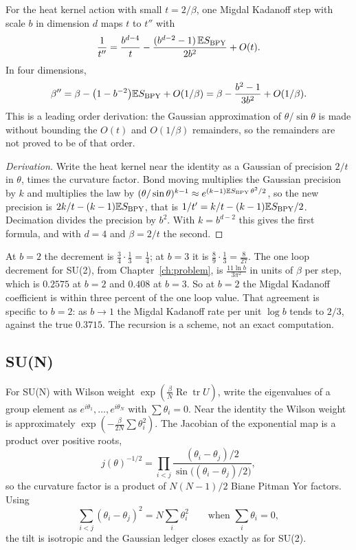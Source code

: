 \begin{remark}\label{prop:decrementB}
For the heat kernel action with small $t=2/\beta$, one Migdal Kadanoff step with scale $b$ in dimension $d$ maps $t$ to $t''$ with
\[
\frac1{t''}=\frac{b^{d-4}}{t}-\frac{(b^{d-2}-1)\,\mathbb{E} S_{\mathrm{BPY}}}{2b^2}+O(t).
\]
In four dimensions,
\[
\beta''=\beta-\big(1-b^{-2}\big)\mathbb{E} S_{\mathrm{BPY}}+O(1/\beta)=\beta-\frac{b^2-1}{3b^2}+O(1/\beta).
\]
This is a leading order derivation: the Gaussian approximation of $\theta/\sin\theta$ is made without bounding the $O(t)$ and $O(1/\beta)$ remainders, so the remainders are not proved to be of that order.
\end{remark}

\begin{proof}[Derivation]
Write the heat kernel near the identity as a Gaussian of precision $2/t$ in $\theta$, times the curvature factor. Bond moving multiplies the Gaussian precision by $k$ and multiplies the law by $(\theta/\sin\theta)^{k-1}\approx e^{(k-1)\mathbb{E} S_{\mathrm{BPY}}\,\theta^2/2}$, so the new precision is $2k/t-(k-1)\mathbb{E} S_{\mathrm{BPY}}$, that is $1/t'=k/t-(k-1)\mathbb{E} S_{\mathrm{BPY}}/2$. Decimation divides the precision by $b^2$. With $k=b^{d-2}$ this gives the first formula, and with $d=4$ and $\beta=2/t$ the second.
\end{proof}

At $b=2$ the decrement is $\frac34\cdot\frac13=\frac14$; at $b=3$ it is $\frac89\cdot\frac13=\frac{8}{27}$. The one loop decrement for SU(2), from Chapter~\ref{ch:problem}, is $\frac{11\ln b}{3\pi^2}$ in units of $\beta$ per step, which is $0.2575$ at $b=2$ and $0.408$ at $b=3$. So at $b=2$ the Migdal Kadanoff coefficient is within three percent of the one loop value. That agreement is specific to $b=2$: as $b\to1$ the Migdal Kadanoff rate per unit $\log b$ tends to $2/3$, against the true $0.3715$. The recursion is a scheme, not an exact computation.

\subsection{SU(N)}

For SU(N) with Wilson weight $\exp(\frac\beta N\operatorname{Re}\operatorname{tr}U)$, write the eigenvalues of a group element as $e^{i\theta_1},\dots,e^{i\theta_N}$ with $\sum\theta_i=0$. Near the identity the Wilson weight is approximately $\exp(-\frac{\beta}{2N}\sum\theta_i^2)$. The Jacobian of the exponential map is a product over positive roots,
\[
j(\theta)^{-1/2}=\prod_{i<j}\frac{(\theta_i-\theta_j)/2}{\sin\big((\theta_i-\theta_j)/2\big)},
\]
so the curvature factor is a product of $N(N-1)/2$ Biane Pitman Yor factors. Using
\[
\sum_{i<j}(\theta_i-\theta_j)^2=N\sum_i\theta_i^2\qquad\text{when }\sum_i\theta_i=0,
\]
the tilt is isotropic and the Gaussian ledger closes exactly as for SU(2).

